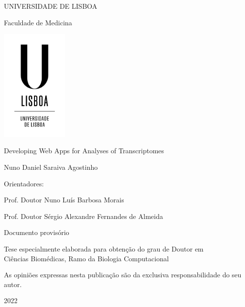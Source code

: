 \documentclass[12pt, twoside]{report}
\begin{document}
\begin{titlepage}
    \begin{center}
        \vspace*{-.2cm}
        UNIVERSIDADE DE LISBOA
        
        Faculdade de Medicina
        
        \includegraphics[width=0.25\textwidth]{images/logo/ulisboa-only}
        
        \vspace{1.8cm}
        Developing Web Apps for Analyses of Transcriptomes

        \vspace{1.1cm}        
            
        \vspace{0.9cm}            
        Nuno Daniel Saraiva Agostinho
    \end{center}

    \vspace{0.9cm}
    Orientadores:

      Prof. Doutor Nuno Luís Barbosa Morais

      Prof. Doutor Sérgio Alexandre Fernandes de Almeida
    
    \vspace{1.6cm}
    \begin{center}
        Documento provisório
        
        Tese especialmente elaborada para obtenção do grau de Doutor em\\
        Ciências Biomédicas, Ramo da Biologia Computacional
        
        As opiniões expressas nesta publicação são da exclusiva responsabilidade do seu autor.
            
        \vfill
        2022
        \vspace{.7cm}    
    \end{center}
\end{titlepage}
\end{document}
